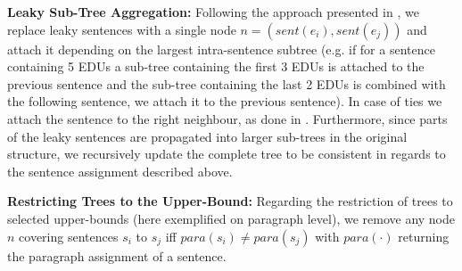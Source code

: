 \documentclass[letterpaper]{article} %
\begin{document}
\noindent
\textbf{Leaky Sub-Tree Aggregation:}
Following the approach presented in \citet{sporleder-lascarides-2004-combining}, we replace leaky sentences with a single node $n = (sent(e_i), sent(e_j))$ and attach it depending on the largest intra-sentence subtree (e.g. if for a sentence containing 5 EDUs a sub-tree containing the first 3 EDUs is attached to the previous sentence and the sub-tree containing the last 2 EDUs is combined with the following sentence, we attach it to the previous sentence). In case of ties we attach the sentence to the right neighbour, as done in \citet{sporleder-lascarides-2004-combining}. Furthermore, since parts of the leaky sentences are propagated into larger sub-trees in the original structure, we recursively update the complete tree to be consistent in regards to the sentence assignment described above.

\noindent
\textbf{Restricting Trees to the Upper-Bound:}
Regarding the restriction of trees to selected upper-bounds (here exemplified on paragraph level), we remove any node $n$ covering sentences $s_i$ to $s_j$ iff $para(s_i) \neq para(s_j)$ with $para(\cdot)$ returning the paragraph assignment of a sentence.

\begin{table}[t]
    \centering
    \setlength{\belowcaptionskip}{-5pt}
    {\renewcommand{\arraystretch}{1.2}
    }
    \caption{Statistics of the three training/testing datasets.}
    \label{tab:datasets}
\end{table}
\end{document}
